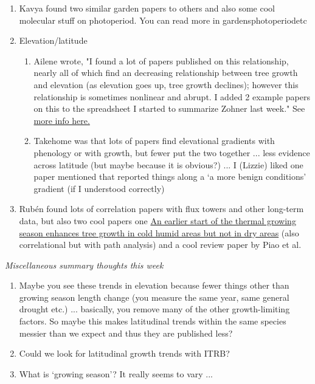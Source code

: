 \documentclass[11pt,letter]{article}
\begin{document}
\begin{enumerate}
\begin{enumerate}
\end{enumerate}
\item Kavya found two similar garden papers to others and also some cool molecular stuff on photoperiod. You can read more in gardensphotoperiodetc
\item Elevation/latitude
\begin{enumerate}
\item Ailene wrote, "I found a lot of papers published on this relationship, nearly all of which find an decreasing relationship between tree growth and elevation (as elevation goes up, tree growth declines); however this relationship is sometimes nonlinear and abrupt. I added 2 example papers on this to the spreadsheet I started to summarize Zohner last week." See \href{https://docs.google.com/spreadsheets/d/1FnjkA6pQbnRd8rtbZzklJBym7ZT6b7FZg7flllBCGA8/edit#gid=0}{more info here.}
\item Takehome was that lots of papers find elevational gradients with phenology or with growth, but fewer put the two together ... less evidence across latitude (but maybe because it is obvious?) ... I (Lizzie) liked one paper mentioned that reported things along a `a more benign conditions' gradient (if I understood correctly)
\end{enumerate}
\item Rub\'en found lots of correlation papers with flux towers and other long-term data, but also two cool papers one \href{https://www.nature.com/articles/s41559-022-01668-4}{An earlier start of the thermal growing season enhances tree growth in cold humid areas but not in dry areas} (also correlational but with path analysis) and a cool review paper by Piao et al. 
\end{enumerate}

\emph{Miscellaneous summary thoughts this week}
\begin{enumerate}
\item Maybe you see these trends in elevation because fewer things other than growing season length change (you measure the same year, same general drought etc.) ... basically, you remove many of the other growth-limiting factors. So maybe this makes latitudinal trends within the same species messier than we expect and thus they are published less?
\item Could we look for latitudinal growth trends with ITRB?
\item What is `growing season'? It really seems to vary ... 
\end{enumerate}
\end{document}

